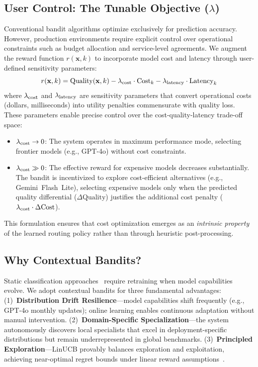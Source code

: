 \subsection{User Control: The Tunable Objective ($\lambda$)}
\label{sec:lambda}

Conventional bandit algorithms optimize exclusively for prediction accuracy. However, production environments require explicit control over operational constraints such as budget allocation and service-level agreements. We augment the reward function $r(\mathbf{x}, k)$ to incorporate model cost and latency through user-defined sensitivity parameters:
\begin{equation}
r(\mathbf{x}, k) = \text{Quality}(\mathbf{x}, k) - \lambda_{\text{cost}} \cdot \text{Cost}_k - \lambda_{\text{latency}} \cdot \text{Latency}_k
\end{equation}
where $\lambda_{\text{cost}}$ and $\lambda_{\text{latency}}$ are sensitivity parameters that convert operational costs (dollars, milliseconds) into utility penalties commensurate with quality loss. These parameters enable precise control over the cost-quality-latency trade-off space:
\begin{itemize}[leftmargin=*,nosep]
    \item $\lambda_{\text{cost}} \to 0$: The system operates in maximum performance mode, selecting frontier models (e.g., GPT-4o) without cost constraints.
    \item $\lambda_{\text{cost}} \gg 0$: The effective reward for expensive models decreases substantially. The bandit is incentivized to explore cost-efficient alternatives (e.g., Gemini~Flash~Lite), selecting expensive models only when the predicted quality differential ($\Delta\text{Quality}$) justifies the additional cost penalty ($\lambda_{\text{cost}} \cdot \Delta\text{Cost}$).
\end{itemize}
This formulation ensures that cost optimization emerges as an \emph{intrinsic property} of the learned routing policy rather than through heuristic post-processing.

\subsection{Why Contextual Bandits?}
\label{sec:pivot}

Static classification approaches~\cite{ong2024routellm} require retraining when model capabilities evolve. We adopt contextual bandits for three fundamental advantages: (1)~\textbf{Distribution Drift Resilience}---model capabilities shift frequently (e.g., GPT-4o monthly updates); online learning enables continuous adaptation without manual intervention. (2)~\textbf{Domain-Specific Specialization}---the system autonomously discovers local specialists that excel in deployment-specific distributions but remain underrepresented in global benchmarks. (3)~\textbf{Principled Exploration}---LinUCB provably balances exploration and exploitation, achieving near-optimal regret bounds under linear reward assumptions~\cite{abbasi2011improved}.

